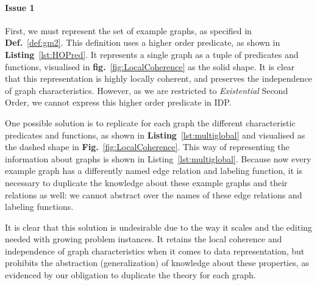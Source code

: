 \paragraph{Issue 1}
First, we must represent the set of example graphs, as specified in \textbf{Def.}~\ref{def:gm2}. 
This definition uses a higher order predicate, as shown in \textbf{Listing}~\ref{lst:HOPred}. 
It represents a single graph as a tuple of predicates and functions, visualised in \textbf{fig.}~\ref{fig:LocalCoherence} as the solid shape.
It is clear that this representation is highly locally coherent, and preserves the independence of graph characteristics.
However, as we are restricted to \emph{Existential} Second Order, we cannot express this higher order predicate in IDP.

One possible solution is to replicate for each graph the different characteristic predicates and functions, as shown
in \textbf{Listing}~\ref{lst:multiglobal} and visualised as the dashed shape in \textbf{Fig.}~\ref{fig:LocalCoherence}.
This way of representing the information about graphs is shown in Listing~\ref{lst:multiglobal}.
Because now every example graph has a differently named edge relation and labeling function, it is necessary to duplicate the knowledge about these example graphs and their relations as well: we cannot abstract  over the names of these edge relations and labeling functions.

It is clear that this solution is undesirable due to the way it scales and the editing needed with growing problem instances.
It retains the local coherence and independence of graph characteristics when it comes to data representation, but prohibits the abstraction (generalization) of knowledge about these properties, as evidenced by our obligation to duplicate the theory for each graph.

